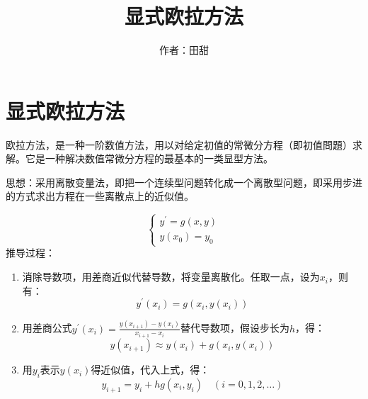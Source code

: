 \documentclass[12pt,a4paper]{article}
\title{显式欧拉方法}
\author{作者：田甜}
\date{\chntoday}
\begin{document}
\maketitle
\newpage
\section{显式欧拉方法}
欧拉方法，是一种一阶数值方法，用以对给定初值的常微分方程（即初值問題）求解。它是一种解决数值常微分方程的最基本的一类显型方法。

思想：采用离散变量法，即把一个连续型问题转化成一个离散型问题，即采用步进的方式求出方程在一些离散点上的近似值。

\begin{equation}
\left\{\begin{array}{l}{y^{\prime}=g(x, y)} \\ {y\left(x_{0}\right)=y_{0}}\end{array}\right.
\end{equation}
推导过程：
\begin{enumerate}[(1)]
	\item 消除导数项，用差商近似代替导数，将变量离散化。任取一点，设为$x_i$，则有：\begin{equation}
	y^{\prime}\left(x_{i}\right)=g\left(x_{i}, y\left(x_{i}\right)\right)
	\end{equation}
	\item 用差商公式$y^{\prime}\left(x_{i}\right)=\frac{y\left(x_{i+1}\right)-y\left(x_{i}\right)}{x_{i+1}-x_{i}}$替代导数项，假设步长为$h$，得：\begin{equation}
	y\left(x_{i+1}\right) \approx y\left(x_{i}\right)+g\left(x_{i}, y\left(x_{i}\right)\right)
	\end{equation}
	\item 用$y_i$表示$y(x_i)$得近似值，代入上式，得：\begin{equation}
	y_{i+1}=y_{i}+h g\left(x_{i}, y_{i}\right) \quad(i=0,1,2, \ldots)
	\end{equation}
\end{enumerate}
\end{document}
